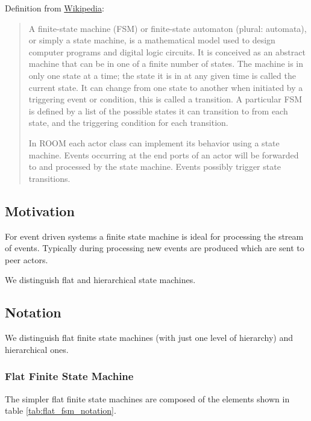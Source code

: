 Definition from \href{http://en.wikipedia.org/wiki/Finite-state\_machine}{Wikipedia}:

\begin{quote}
A finite-state machine (FSM) or finite-state automaton (plural: automata), or simply a state machine, is a 
mathematical model used to design computer programs and digital logic circuits. It is conceived as an 
abstract machine that can be in one of a finite number of states. The machine is in only one state at a 
time; the state it is in at any given time is called the current state. It can change from one state to 
another when initiated by a triggering event or condition, this is called a transition. A particular FSM 
is defined by a list of the possible states it can transition to from each state, and the triggering 
condition for each transition.

In ROOM each actor class can implement its behavior using a state machine. Events occurring at the end 
ports of an actor will be forwarded to and processed by the state machine. Events possibly trigger state 
transitions.
\end{quote}

\subsection{Motivation}

For event driven systems a finite state machine is ideal for processing the stream of events. Typically 
during processing new events are produced which are sent to peer actors.

We distinguish flat and hierarchical state machines.

\subsection{Notation}

We distinguish flat finite state machines (with just one level of hierarchy) and hierarchical ones.

\subsubsection*{Flat Finite State Machine}

The simpler flat finite state machines are composed of the elements shown in table \ref{tab:flat_fsm_notation}.


